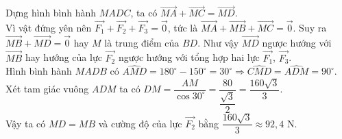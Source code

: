 \begin{bt}
{\begin{center}
		\end{center}
		Dựng hình bình hành $MADC$, ta có $\overrightarrow{MA}+\overrightarrow{MC}=\overrightarrow{MD}$.\\
		Vì vật đứng yên nên $\overrightarrow{F_1}+\overrightarrow{F_2}+\overrightarrow{F_3}=\overrightarrow{0}$, tức là  $\overrightarrow{MA}+\overrightarrow{MB}+\overrightarrow{MC}=\overrightarrow{0}$. Suy ra $\overrightarrow{MB}+\overrightarrow{MD}=\overrightarrow{0}$ hay $M$ là trung điểm của $BD$. Như vậy $\overrightarrow{MD}$ ngược hướng với $\overrightarrow{MB}$ hay hướng của lực $\overrightarrow{F_2}$ ngược hướng với tổng hợp hai lực $\overrightarrow{F_1}$, $\overrightarrow{F_3}$. \\
		Hình bình hành $MADB$ có  $\widehat{AMD}=180^\circ-150^\circ=30^\circ\Rightarrow\widehat{CMD}=\widehat{ADM}=90^\circ$.\\
		Xét tam giác vuông $ADM$ ta có $DM=\dfrac{AM}{\cos 30^\circ}=\dfrac{80}{\dfrac{\sqrt{3}}{2}}=\dfrac{160\sqrt{3}}{3}$.\\
		Vậy ta có $MD=MB$ và cường độ của lực $\overrightarrow{F_2}$ bằng $\dfrac{160\sqrt{3}}{3}\approx 92{,}4$ N.
	}
\end{bt}

